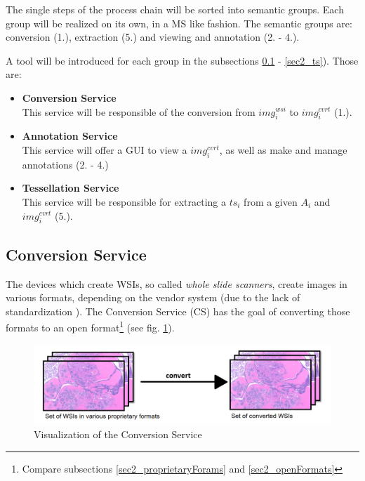 The single steps of the process chain will be sorted into semantic groups. Each group will be realized on its own, in a MS like fashion. The semantic groups are: conversion (1.), extraction (5.) and viewing and annotation (2. - 4.).

A tool will be introduced for each group in the subsections \ref{sec2_cs} - \ref{sec2_ts}). Those are:

\begin{itemize}
	\item \textbf{Conversion Service}\\
	This service will be responsible of the conversion from $img^{wsi}_i$ to $img^{cvrt}_i$ (1.).
	\item \textbf{Annotation Service}\\
	This service will offer a GUI to view a $img^{cvrt}_i$, as well as make and manage annotations (2. - 4.)
	\item \textbf{Tessellation Service}\\
	This service will be responsible for extracting a $ts_i$ from a given $A_i$ and $img^{cvrt}_i$ (5.).
\end{itemize}


\subsection{Conversion Service}
\label{sec2_cs}
The devices which create WSIs, so called \emph{whole slide scanners}, create images in various formats, depending on the vendor system (due to the lack of standardization \cite{Cornish13}). The Conversion Service (CS) has the goal of converting those formats to an open format\footnote{Compare subsections \ref{sec2_proprietaryForams} and \ref{sec2_openFormats}} (see fig. \ref{fig2_processChainA}).

\begin{figure}[H]
	\begin{center}
		\includegraphics[scale=0.35]{img/processChainA.png}
		\caption{Visualization of the Conversion Service}
		\label{fig2_processChainA}
	\end{center}
\end{figure}


